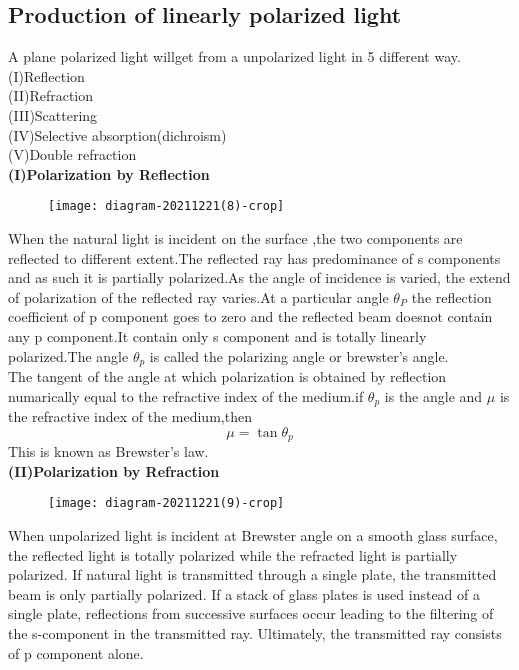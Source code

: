  \subsection{Production of linearly polarized light}
 A plane polarized light willget from a unpolarized light in 5 different way.\\
 (I)Reflection \\
 (II)Refraction\\
 (III)Scattering\\
 (IV)Selective absorption(dichroism) \\
 (V)Double refraction\\
 \textbf{(I)Polarization by Reflection}\\
 \begin{figure}[H]
 	\centering
 	\texttt{[image: diagram-20211221(8)-crop]}
 	\caption{}
 	\label{}
 \end{figure}
      When the natural light is incident on the surface ,the two components are reflected to different extent.The reflected ray has predominance of s components and as such it is partially polarized.As the angle of incidence is varied, the extend of polarization of the reflected ray varies.At a particular angle $\theta_P$ the reflection  coefficient of p component goes to zero and the reflected beam doesnot contain any p component.It contain only s component and is totally linearly polarized.The angle $\theta_p$ is called the polarizing angle or brewster's angle.\\
      The tangent of the angle at which polarization is obtained by reflection numarically equal to the refractive index of the medium.if $\theta_p$ is the angle and $\mu$ is the refractive index of the medium,then 
      $$\mu=\tan \theta_p$$
      This is known as Brewster's law.\\
      \textbf{(II)Polarization by Refraction}\\
      \begin{figure}[H]
      	\centering
      	\texttt{[image: diagram-20211221(9)-crop]}
      	\caption{}
      	\label{}
      \end{figure}
      When unpolarized light is incident at Brewster angle on a smooth glass surface, the reflected light is totally polarized while the refracted light is partially polarized. If natural light is transmitted through a single plate, the transmitted beam is only partially polarized. If a stack of glass plates is used instead of a single plate, reflections from successive surfaces occur leading to the filtering of the s-component in the transmitted ray. Ultimately, the transmitted ray consists of p component alone.\\

